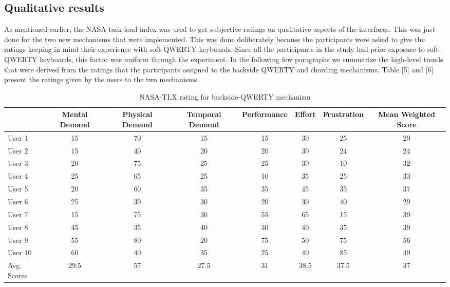 \subsection{Qualitative results}
As mentioned earlier, the NASA task load index was used to get subjective ratings on qualitative aspects of the interfaces. This was just done for the two new mechanisms that were implemented. This was done deliberately because the participants were asked to give the ratings keeping in mind their experience with soft-QWERTY keyboards. Since all the participants in the study had prior exposure to soft-QWERTY keyboards, this factor was uniform through the experiment. In the following few paragraphs we summarize the high-level trends that were derived from the ratings that the participants assigned to the backside QWERTY and chording mechanisms. Table [5] and [6] present the ratings given by the users to the two mechanisms.
\begin{table*}
	\centering
		\begin{tabular}{|l|c|c|c|c|c|c|c|} \hline
		                         & Mental Demand & Physical Demand & Temporal Demand & Performance & Effort & Frustration & Mean Weighted Score \\ \hline
			 User 1 & 15 & 70 & 15 & 15 & 30 & 25 & 29\\ \hline
			 User 2 & 15 & 40 & 20 & 20 & 30 & 24 & 24\\ \hline
			 User 3 & 20 & 75 & 25 & 25 & 30 & 10 & 32\\ \hline
			 User 4 & 25 & 65 & 25 & 10 & 35 & 25 & 33\\ \hline
			 User 5 & 20 & 60 & 35 & 35 & 45 & 35 & 37\\ \hline
			 User 6 & 25 & 30 & 30 & 20 & 30 & 40 & 29\\ \hline
			 User 7 & 15 & 75 & 30 & 55 & 65 & 15 & 39\\ \hline
			 User 8 & 45 & 35 & 40 & 30 & 40 & 35 & 39\\ \hline
			 User 9 & 55 & 80 & 20 & 75 & 50 & 75 & 56\\ \hline
			 User 10 & 60 & 40 & 35 & 25 & 40 & 85 & 49\\ \hline  
			 Avg. Scores & 29.5 & 57 & 27.5 & 31 & 38.5 & 37.5 & 37\\ \hline
		\end{tabular}
	\caption{NASA-TLX rating for backside-QWERTY mechanism}
	\label{tab:StatisticsForTextCorpora}
\end{table*}	
